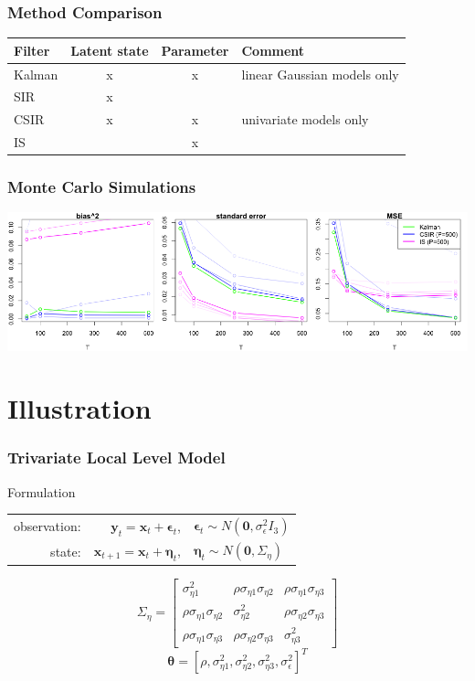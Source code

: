 \documentclass[11pt]{beamer}
\begin{document}
\begin{frame}
\frametitle{Method Comparison}
\begin{table}
\centering
\begin{tabular}{lccl}
\hline
Filter  & Latent state & Parameter & Comment\\
\hline
Kalman    & x & x & linear Gaussian models only\\
SIR      & x & &\\
CSIR      & x & x & univariate models only\\
IS      & & x & \\
\hline
\end{tabular}
\end{table}
\end{frame}

\begin{frame}
\frametitle{Monte Carlo Simulations}
\centering
\includegraphics[scale=0.30]{ullm-mc-mle}
\end{frame}

\section{Illustration}

\begin{frame}
\frametitle{Trivariate Local Level Model}
\begin{block}{Formulation}
\begin{center}
\begin{tabular}{ r r l }
  observation: & $\boldsymbol{y}_t = \boldsymbol{x}_t + \boldsymbol{\epsilon}_t$, & $\boldsymbol{\epsilon}_t \sim N(\textbf{0}, \sigma_{\epsilon}^2 I_3)$ \\
  state: & $\boldsymbol{x}_{t+1} = \boldsymbol{x}_t + \boldsymbol{\eta}_t$, & $\boldsymbol{\eta}_t \sim N(\textbf{0}, \Sigma_{\eta})$ \\
\end{tabular}
\end{center}
\end{block}
$$
\Sigma_{\eta} = 
\begin{bmatrix}
\sigma_{\eta 1}^2 & \rho \sigma_{\eta 1} \sigma_{\eta 2} & \rho \sigma_{\eta 1} \sigma_{\eta 3}
\\ \rho \sigma_{\eta 1} \sigma_{\eta 2} & \sigma_{\eta 2}^2 & \rho \sigma_{\eta 2} \sigma_{\eta 3}
\\ \rho \sigma_{\eta 1} \sigma_{\eta 3} & \rho \sigma_{\eta 2} \sigma_{\eta 3} & \sigma_{\eta 3}^2
\end{bmatrix}
$$
\bigskip
$$
\boldsymbol{\theta} = [\rho, \sigma_{\eta 1}^2, \sigma_{\eta 2}^2, \sigma_{\eta 3}^2, \sigma_{\epsilon}^2]^T
$$
\end{frame}
\end{document}
